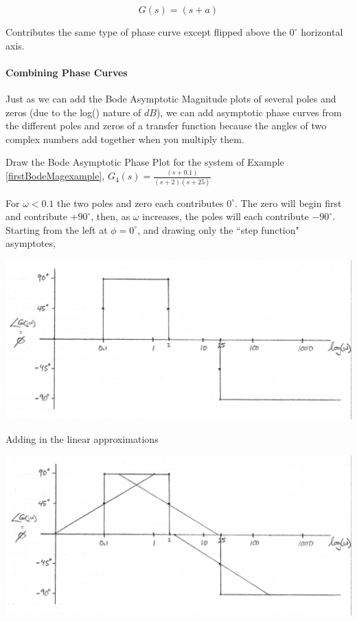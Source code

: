 \[
G(s) = (s+a)
\]

Contributes the same type of phase curve except flipped above the $0^\circ$ horizontal axis.

\paragraph{Combining Phase Curves}

Just as we can add the Bode Asymptotic Magnitude plots of several poles and zeros (due to the log() nature of $dB$), we can add asymptotic phase curves from the different poles and zeros of a transfer function because the angles of two complex numbers add together when you multiply them.

\begin{Example}

Draw the Bode Asymptotic Phase Plot for the system of Example \thechapter \ref{firstBodeMagexample},
$G_4(s) = \frac  {(s+0.1)}  {(s+2)(s+25)}$

For $\omega < 0.1$ the two poles and  zero each contributes $0^\circ$.  The zero will begin first and contribute $+90^\circ$, then, as $\omega$ increases, the  poles will each contribute $-90^\circ$.   Starting from the left at $\phi=0^\circ$, and drawing only the ``step function" asymptotes,


\includegraphics[width=5.5in]{figs05/00758a.png}

Adding in the linear approximations

\includegraphics[width=5.5in]{figs05/00759a.png}


\end{Example}
